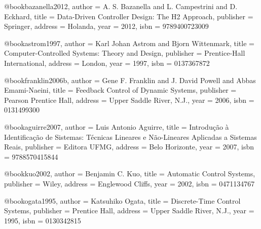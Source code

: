 %

@book{bazanella2012,
  author = {A. S. Bazanella and L. Campestrini and D. Eckhard},
  title = {Data-Driven Controller Design: The H2 Approach},
  publisher = {Springer},
  address = {Holanda},
  year = {2012},
  isbn = {9789400723009}
}

@book{astrom1997,
  author = {Karl Johan Astrom and Bjorn Wittenmark},
  title = {Computer-Controlled Systems: Theory and Design},
  publisher = {Prentice-Hall International},
  address = {London},
  year = {1997},
  isbn = {0137367872}
}

@book{franklin2006b,
  author = {Gene F. Franklin and J. David Powell and Abbas Emami-Naeini},
  title = {Feedback Control of Dynamic Systems},
  publisher = {Pearson Prentice Hall},
  address = {Upper Saddle River, N.J.},
  year = {2006},
  isbn = {0131499300}
}

@book{aguirre2007,
  author = {Luis Antonio Aguirre},
  title = {Introdução à Identificação de Sistemas: Técnicas Lineares e Não-Lineares Aplicadas a Sistemas Reais},
  publisher = {Editora UFMG},
  address = {Belo Horizonte},
  year = {2007},
  isbn = {9788570415844}
}

@book{kuo2002,
  author = {Benjamin C. Kuo},
  title = {Automatic Control Systems},
  publisher = {Wiley},
  address = {Englewood Cliffs},
  year = {2002},
  isbn = {0471134767}
}

@book{ogata1995,
  author = {Katsuhiko Ogata},
  title = {Discrete-Time Control Systems},
  publisher = {Prentice Hall},
  address = {Upper Saddle River, N.J.},
  year = {1995},
  isbn = {0130342815}
}

